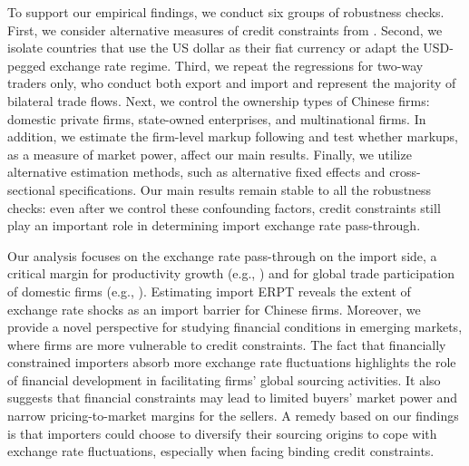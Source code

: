 To support our empirical findings, we conduct six groups of robustness checks. First, we consider alternative measures of credit constraints from \cite{fan-lai-li2015}. Second, we isolate countries that use the US dollar as their fiat currency or adapt the USD-pegged exchange rate regime. Third, we repeat the regressions for two-way traders only, who conduct both export and import and represent the majority of bilateral trade flows. Next, we control the ownership types of Chinese firms: domestic private firms, state-owned enterprises, and multinational firms. In addition, we estimate the firm-level markup following \cite{dlw2012} and test whether markups, as a measure of market power, affect our main results. Finally, we utilize alternative estimation methods, such as alternative fixed effects and cross-sectional specifications. Our main results remain stable to all the robustness checks: even after we control these confounding factors, credit constraints still play an important role in determining import exchange rate pass-through. 

Our analysis focuses on the exchange rate pass-through on the import side, a critical margin for productivity growth (e.g., \citealp{amiti2007trade,brandt2012}) and for global trade participation of domestic firms (e.g., \citealp{bernard2018global,li2023bilateral}). Estimating import ERPT reveals the extent of exchange rate shocks as an import barrier for Chinese firms. Moreover, we provide a novel perspective for studying financial conditions in emerging markets, where firms are more vulnerable to credit constraints. The fact that financially constrained importers absorb more exchange rate fluctuations highlights the role of financial development in facilitating firms' global sourcing activities. It also suggests that financial constraints may lead to limited buyers' market power and narrow pricing-to-market margins for the sellers. A remedy based on our findings is that importers could choose to diversify their sourcing origins to cope with exchange rate fluctuations, especially when facing binding credit constraints. 

